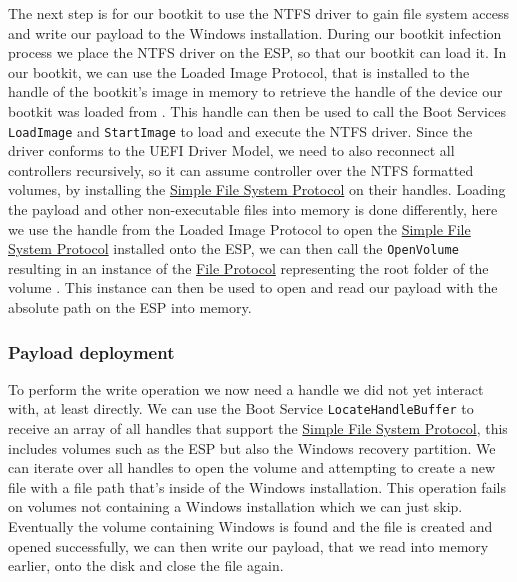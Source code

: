 The next step is for our bootkit to use the \ac{NTFS} driver to gain file system access and write our payload to the Windows installation.
During our bootkit infection process we place the \ac{NTFS} driver on the \ac{ESP}, so that our bootkit can load it.
In our bootkit, we can use the Loaded Image Protocol, that is installed to the handle of the bootkit's image in memory to retrieve the handle of the device our bootkit was loaded from \cite[9.1 EFI Loaded Image Protocol]{uefi-spec}.
This handle can then be used to call the Boot Services \lstinline{LoadImage} and \lstinline{StartImage} to load and execute the NTFS driver.
Since the driver conforms to the UEFI Driver Model, we need to also reconnect all controllers recursively, so it can assume controller over the NTFS formatted volumes, by installing the \hyperref[lst:simple-filesystem-protocol]{Simple File System Protocol} on their handles.
Loading the payload and other non-executable files into memory is done differently, here we use the handle from the Loaded Image Protocol to open the \hyperref[lst:simple-filesystem-protocol]{Simple File System Protocol} installed onto the \ac{ESP}, we can then call the \lstinline{OpenVolume} resulting in an instance of the \hyperref[lst:file-protocol]{File Protocol} representing the root folder of the volume \cite[13.4]{uefi-spec}.
This instance can then be used to open and read our payload with the absolute path on the \ac{ESP} into memory.

\subsubsection{Payload deployment}

To perform the write operation we now need a handle we did not yet interact with, at least directly.
We can use the Boot Service \lstinline{LocateHandleBuffer} to receive an array of all handles that support the \hyperref[lst:simple-filesystem-protocol]{Simple File System Protocol}, this includes volumes such as the \ac{ESP} but also the Windows recovery partition.
We can iterate over all handles to open the volume and attempting to create a new file with a file path that's inside of the Windows installation.
This operation fails on volumes not containing a Windows installation which we can just skip.
Eventually the volume containing Windows is found and the file is created and opened successfully, we can then write our payload, that we read into memory earlier, onto the disk and close the file again.

